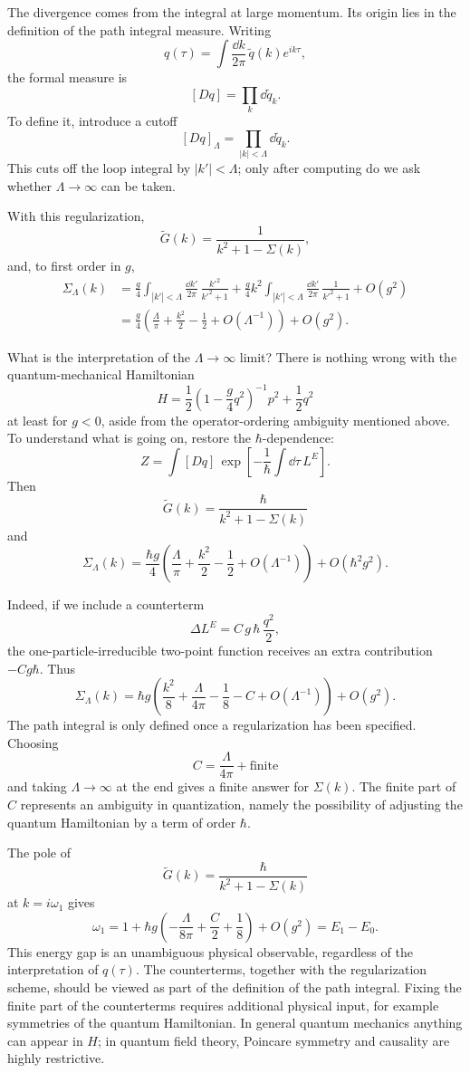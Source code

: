 The divergence comes from the integral at large momentum. Its origin lies in
the definition of the path integral measure. Writing
\[
  q(\tau)=\int\frac{\dd k}{2\pi}\,\widetilde q(k)e^{ik\tau},
\]
the formal measure is
\[
  [Dq]=\prod_k \dd \widetilde q_k .
\]
To define it, introduce a cutoff
\[
  [Dq]_\Lambda=\prod_{|k|<\Lambda}\dd \widetilde q_k .
\]
This cuts off the loop integral by \(|k'|<\Lambda\); only after computing do
we ask whether \(\Lambda\to\infty\) can be taken.

With this regularization,
\[
  \widetilde G(k)
  =\frac{1}{k^2+1-\Sigma(k)} ,
\]
and, to first order in \(g\),
\[
\begin{aligned}
  \Sigma_\Lambda(k)
  &=
  \frac{g}{4}\int_{|k'|<\Lambda}
       \frac{\dd k'}{2\pi}\,\frac{k'^2}{k'^2+1}
  +\frac{g}{4}k^2
       \int_{|k'|<\Lambda}
       \frac{\dd k'}{2\pi}\,\frac{1}{k'^2+1}
  +O(g^2)\\
  &=
  \frac{g}{4}\left(
    \frac{\Lambda}{\pi}+\frac{k^2}{2}-\frac12+O(\Lambda^{-1})
  \right)+O(g^2).
\end{aligned}
\]

What is the interpretation of the \(\Lambda\to\infty\) limit? There is
nothing wrong with the quantum-mechanical Hamiltonian
\[
  H=\frac12\left(1-\frac{g}{4}q^2\right)^{-1}p^2+\frac12q^2
\]
at least for \(g<0\), aside from the operator-ordering ambiguity mentioned
above. To understand what is going on, restore the \(\hbar\)-dependence:
\[
  Z=\int[Dq]\,
  \exp\left[-\frac{1}{\hbar}\int\dd\tau\,L^E\right].
\]
Then
\[
  \widetilde G(k)=\frac{\hbar}{k^2+1-\Sigma(k)}
\]
and
\[
  \Sigma_\Lambda(k)
  =\frac{\hbar g}{4}\left(
    \frac{\Lambda}{\pi}+\frac{k^2}{2}-\frac12+O(\Lambda^{-1})
  \right)+O(\hbar^2g^2).
\]

Indeed, if we include a counterterm
\[
  \Delta L^E=C\,g\,\hbar\,\frac{q^2}{2},
\]
the one-particle-irreducible two-point function receives an extra
contribution \(-C g\hbar\). Thus
\[
  \Sigma_\Lambda(k)
  =
  \hbar g\left(
    \frac{k^2}{8}+\frac{\Lambda}{4\pi}
    -\frac18-C+O(\Lambda^{-1})
  \right)+O(g^2).
\]
The path integral is only defined once a regularization has been specified.
Choosing
\[
  C=\frac{\Lambda}{4\pi}+\text{finite}
\]
and taking \(\Lambda\to\infty\) at the end gives a finite answer for
\(\Sigma(k)\). The finite part of \(C\) represents an ambiguity in
quantization, namely the possibility of adjusting the quantum Hamiltonian by a
term of order \(\hbar\).

The pole of
\[
  \widetilde G(k)=\frac{\hbar}{k^2+1-\Sigma(k)}
\]
at \(k=i\omega_1\) gives
\[
  \omega_1
  =
  1+\hbar g\left(
    -\frac{\Lambda}{8\pi}+\frac{C}{2}+\frac18
  \right)+O(g^2)
  =E_1-E_0 .
\]
This energy gap is an unambiguous physical observable, regardless of the
interpretation of \(q(\tau)\). The counterterms, together with the
regularization scheme, should be viewed as part of the definition of the path
integral. Fixing the finite part of the counterterms requires additional
physical input, for example symmetries of the quantum Hamiltonian. In general
quantum mechanics anything can appear in \(H\); in quantum field theory,
Poincare symmetry and causality are highly restrictive.


